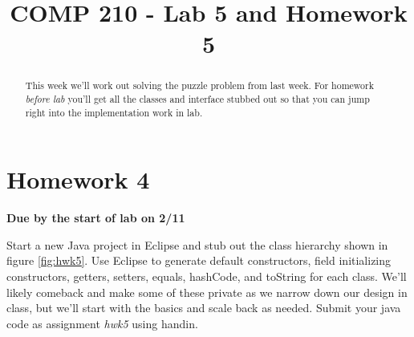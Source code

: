 \documentclass[]{tufte-handout}
\title{COMP 210 - Lab 5 and Homework 5}
\begin{document}
\maketitle

\begin{abstract}
This week we'll work out solving the puzzle problem from last week. For homework \textit{before lab} you'll get all the classes and interface stubbed out so that you can jump right into the implementation work in lab. 
\end{abstract}

\section{Homework 4}

\begin{center}
\textbf{Due by the start of lab on 2/11}
\end{center}

Start a new Java project in Eclipse and stub out the class hierarchy shown in figure \ref{fig:hwk5}. Use Eclipse to generate default constructors, field initializing constructors, getters, setters, equals, hashCode, and toString for each class.  We'll likely comeback and make some of these private as we narrow down our design in class, but we'll start with the basics and scale back as needed. Submit your java code as assignment \textit{hwk5} using handin.
\end{document}
